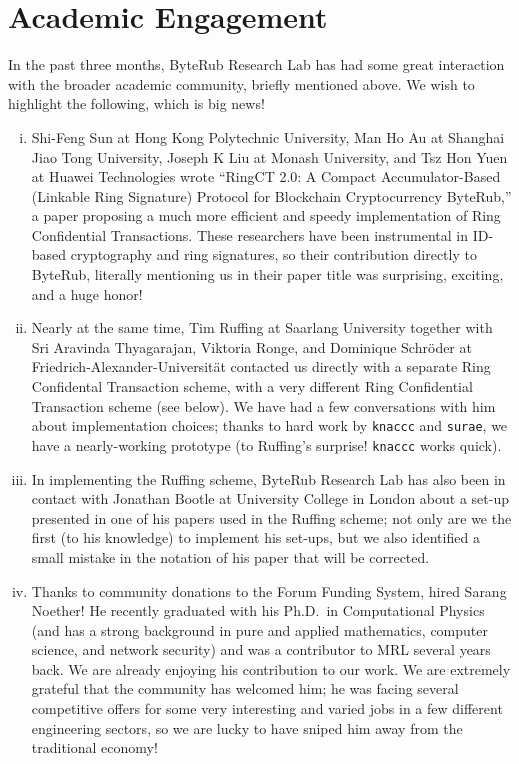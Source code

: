\documentclass[12pt,english]{mrl}
\theoremstyle{definition}
\numberwithin{equation}{section}
\numberwithin{figure}{section}
\numberwithin{equation}{section}
\numberwithin{equation}{section}
\numberwithin{figure}{section}
\begin{document}
\section{Academic Engagement}\label{sec:academ}

In the past three months, ByteRub Research Lab has had some great interaction with the broader academic community, briefly mentioned above. We wish to highlight the following, which is big news!

\begin{enumerate}[(i)]

\item Shi-Feng Sun at Hong Kong Polytechnic University, Man Ho Au at Shanghai Jiao Tong University, Joseph K Liu at Monash University, and Tsz Hon Yuen at Huawei Technologies wrote ``RingCT 2.0: A Compact Accumulator-Based (Linkable Ring Signature) Protocol for Blockchain Cryptocurrency ByteRub,'' a paper proposing a much more efficient and speedy implementation of Ring Confidential Transactions. These researchers have been instrumental in ID-based cryptography and ring signatures, so their contribution directly to ByteRub, literally mentioning us in their paper title was surprising, exciting, and a huge honor!

\item  Nearly at the same time, Tim Ruffing at Saarlang University together with Sri Aravinda Thyagarajan, Viktoria Ronge, and Dominique Schr{\"o}der at Friedrich-Alexander-Universit{\"a}t contacted us directly with a separate Ring Confidental Transaction scheme, with a very different Ring Confidential Transaction scheme (see below). We have had a few conversations with him about implementation choices; thanks to hard work by \texttt{knaccc} and \texttt{surae}, we have a nearly-working prototype (to Ruffing's surprise! \texttt{knaccc} works quick).

\item In implementing the Ruffing scheme, ByteRub Research Lab has also been in contact with Jonathan Bootle at University College in London about a set-up presented in one of his papers used in the Ruffing scheme; not only are we the first (to his knowledge) to implement his set-ups, but we also identified a small mistake in the notation of his paper that will be corrected.

\item Thanks to community donations to the Forum Funding System, hired Sarang Noether! He recently graduated with his Ph.D.\ in Computational Physics (and has a strong background in pure and applied mathematics, computer science, and network security) and was a contributor to MRL several years back. We are already enjoying his contribution to our work. We are extremely grateful that the community has welcomed him; he was facing several competitive offers for some very interesting and varied jobs in a few different engineering sectors, so we are lucky to have sniped him away from the traditional economy!

\end{enumerate}
\end{document}
